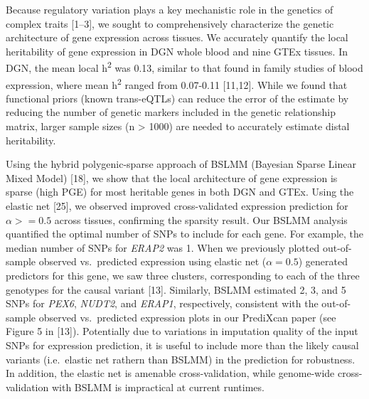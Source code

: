\documentclass[]{article}
\begin{document}
Because regulatory variation plays a key mechanistic role in the
genetics of complex traits {[}1--3{]}, we sought to comprehensively
characterize the genetic architecture of gene expression across tissues.
We accurately quantify the local heritability of gene expression in DGN
whole blood and nine GTEx tissues. In DGN, the mean local
h\textsuperscript{2} was 0.13, similar to that found in family studies
of blood expression, where mean h\textsuperscript{2} ranged from
0.07-0.11 {[}11,12{]}. While we found that functional priors (known
trans-eQTLs) can reduce the error of the estimate by reducing the number
of genetic markers included in the genetic relationship matrix, larger
sample sizes (n \textgreater{} 1000) are needed to accurately estimate
distal heritability.

Using the hybrid polygenic-sparse approach of BSLMM (Bayesian Sparse
Linear Mixed Model) {[}18{]}, we show that the local architecture of
gene expression is sparse (high PGE) for most heritable genes in both
DGN and GTEx. Using the elastic net {[}25{]}, we observed improved
cross-validated expression prediction for \(\alpha>=0.5\) across
tissues, confirming the sparsity result. Our BSLMM analysis quantified
the optimal number of SNPs to include for each gene. For example, the
median number of SNPs for \emph{ERAP2} was 1. When we previously plotted
out-of-sample observed vs.~predicted expression using elastic net
(\(\alpha=0.5\)) generated predictors for this gene, we saw three
clusters, corresponding to each of the three genotypes for the causal
variant {[}13{]}. Similarly, BSLMM estimated 2, 3, and 5 SNPs for
\emph{PEX6}, \emph{NUDT2}, and \emph{ERAP1}, respectively, consistent
with the out-of-sample observed vs.~predicted expression plots in our
PrediXcan paper (see Figure 5 in {[}13{]}). Potentially due to
variations in imputation quality of the input SNPs for expression
prediction, it is useful to include more than the likely causal variants
(i.e.~elastic net rathern than BSLMM) in the prediction for robustness.
In addition, the elastic net is amenable cross-validation, while
genome-wide cross-validation with BSLMM is impractical at current
runtimes.
\end{document}
